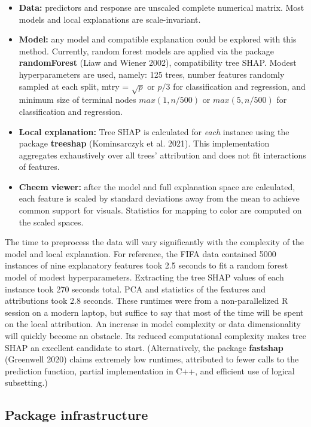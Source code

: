 \documentclass[
]{article}
\begin{document}
\begin{itemize}
    \item \textbf{Data:} predictors and response are unscaled complete numerical matrix. Most models and local explanations are scale-invariant.
    \item \textbf{Model:} any model and compatible explanation could be explored with this method. Currently, random forest models are applied via the package \textbf{randomForest} (Liaw and Wiener 2002), compatibility tree SHAP. Modest hyperparameters are used, namely: 125 trees, number features randomly sampled at each split, mtry = $\sqrt{p}$ or $p/3$ for classification and regression, and minimum size of terminal nodes $max(1, n/500)$ or $max(5, n/500)$ for classification and regression. 
    \item \textbf{Local explanation:} Tree SHAP is calculated for \emph{each} instance using the package \textbf{treeshap} (Kominsarczyk et al. 2021). This implementation aggregates exhaustively over all trees' attribution and does not fit interactions of features.
    \item \textbf{Cheem viewer:} after the model and full explanation space are calculated, each feature is scaled by standard deviations away from the mean to achieve common support for visuals. Statistics for mapping to color are computed on the scaled spaces.
\end{itemize}

The time to preprocess the data will vary significantly with the complexity of the model and local explanation. For reference, the FIFA data contained 5000 instances of nine explanatory features took 2.5 seconds to fit a random forest model of modest hyperparameters. Extracting the tree SHAP values of each instance took 270 seconds total. PCA and statistics of the features and attributions took 2.8 seconds. These runtimes were from a non-parallelized R session on a modern laptop, but suffice to say that most of the time will be spent on the local attribution. An increase in model complexity or data dimensionality will quickly become an obstacle. Its reduced computational complexity makes tree SHAP an excellent candidate to start. (Alternatively, the package \textbf{fastshap} (Greenwell 2020) claims extremely low runtimes, attributed to fewer calls to the prediction function, partial implementation in C++, and efficient use of logical subsetting.)

\hypertarget{sec:infrastructure}{%
\subsection{Package infrastructure}\label{sec:infrastructure}}
\end{document}
